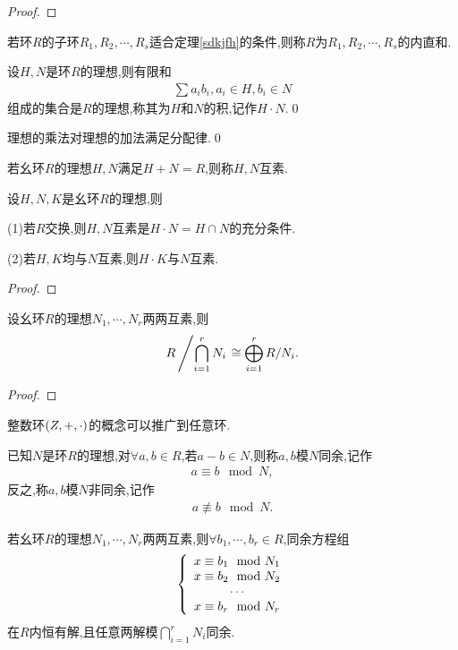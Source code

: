 \begin{proof}
    \stars
\end{proof}
\begin{definition}[内直和]
    若环$R$的子环$R_1,R_2,\cdots,R_s$适合定理\ref{sdkjfh}的条件,则称$R$为$R_1,R_2,\cdots,R_s$的内直和.
\end{definition}
\begin{definition}[理想的积]\label{lxdj}
    设$H,N$是环$R$的理想,则有限和\begin{align*}
        \sum a_ib_i,a_i\in H,b_i\in N
    \end{align*}组成的集合是$R$的理想,称其为$H$和$N$的积,记作$H\cdot N.$\qed
\end{definition}
\begin{remark}
    理想的乘法对理想的加法满足分配律.\qed
\end{remark}
\begin{definition}[互素]\label{hs}
    若幺环$R$的理想$H,N$满足$H+N=R$,则称$H,N$互素.
\end{definition}
\begin{lemma}
    设$H,N,K$是幺环$R$的理想,则

    (1)若$R$交换,则$H,N$互素是$H\cdot N=H\cap N$的充分条件.

    (2)若$H,K$均与$N$互素,则$H\cdot K$与$N$互素.
\end{lemma}
\begin{proof}
    \stars
\end{proof}
\begin{theorem}\label{p105dl5}
    设幺环$R$的理想$N_1,\cdots,N_r$两两互素,则\begin{align*}
        R\left/\bigcap_{i=1}^{r}N_i\right.\cong\bigoplus_{i=1}^{r}R/N_i.
    \end{align*}
\end{theorem}
\begin{proof}
    \stars
\end{proof}
整数环$\left(\relax{Z},+,\cdot\right)$的概念可以推广到任意环.
\begin{definition}[模$N$同余]
    已知$N$是环$R$的理想,对$\forall a,b\in R$,若$a-b\in N$,则称$a,b$模$N$同余,记作\begin{align*}
        a\equiv b\mod N,
    \end{align*}反之,称$a,b$模$N$非同余,记作\begin{align*}
        a\not\equiv b\mod N.
    \end{align*}
\end{definition}
\begin{theorem}[中国剩余定理]\label{vguydl}
    若幺环$R$的理想$N_1,\cdots,N_r$两两互素,则$\forall b_1,\cdots,b_r\in R$,同余方程组\begin{align*}
        \left\{\begin{array}{c}
            x\equiv b_1\mod N_1\\
            x\equiv b_2\mod N_2\\
            \cdots\\
            x\equiv b_r\mod N_r
        \end{array}\right.
    \end{align*}在$R$内恒有解,且任意两解模$\bigcap_{i=1}^{r}N_i$同余.
\end{theorem}
